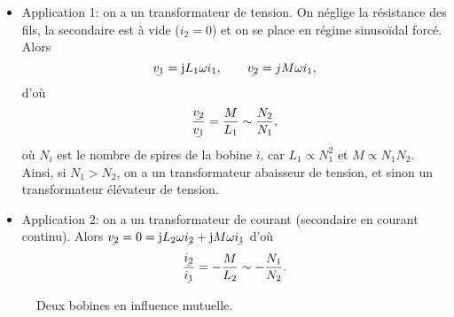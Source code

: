 \begin{itemize}
    \item Application 1: on a un transformateur de tension. On néglige la résistance des fils, la secondaire est à vide ($i_2=0$) et on se place en régime sinusoïdal forcé. Alors
    \begin{equation}
        \ubar{v_1}=\rmj L_1\omega i_1,\qquad \ubar{v_2}=j M\omega i_1,
    \end{equation}
    d'où
    \begin{equation}
        \frac{\ubar{v_2}}{\ubar{v_1}}=\frac{M}{L_1}\sim\frac{N_2}{N_1},
    \end{equation}
    où $N_i$ est le nombre de spires de la bobine $i$, car $L_1\propto N_1^{2}$ et $M\propto N_1 N_2$. Ainsi, si $N_1>N_2$, on a un transformateur abaisseur de tension, et sinon un transformateur élévateur de tension.
    \item Application 2: on a un transformateur de courant (secondaire en courant continu). Alors $\ubar{v_2}=0=\rmj L_2\omega\ubar{i_2}+\rmj M\omega\ubar{i_1}$ d'où
    \begin{equation}
        \frac{\ubar{i_2}}{\ubar{i_1}}=-\frac{M}{L_2}\sim-\frac{N_1}{N_2}.
    \end{equation}
\end{itemize}

\begin{figure}
    \centering
    \caption{Deux bobines en influence mutuelle.}
    \label{fig:deux_bobines_influence_mutuelle}
\end{figure}